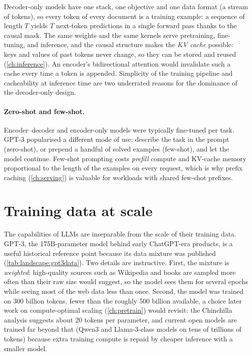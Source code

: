 \begin{systemslens}
Decoder-only models have one stack, one objective and one data format (a stream of tokens), so
every token of every document is a training example: a sequence of length $T$ yields $T$ next-token
predictions in a single forward pass thanks to the causal mask. The same weights and the same kernels
serve pretraining, fine-tuning, and inference, and the causal structure makes the \emph{KV cache}
possible: keys and values of past tokens never change, so they can be stored and reused
(\cref{ch:inference}). An encoder's bidirectional attention would invalidate such a cache every time a
token is appended. Simplicity of the training pipeline and cacheability at inference time are two
underrated reasons for the dominance of the decoder-only design.
\end{systemslens}

\paragraph{Zero-shot and few-shot.}
Encoder--decoder and encoder-only models were typically fine-tuned per task. GPT-3 popularised a different
mode of use: describe the task in the prompt (zero-shot), or prepend a handful of solved examples
(few-shot), and let the model continue. Few-shot prompting costs \emph{prefill} compute and KV-cache
memory proportional to the length of the examples on every request, which is why prefix caching
(\cref{ch:serving}) is valuable for workloads with shared few-shot prefixes.

\section{Training data at scale}\label{sec:landscape:data}

The capabilities of LLMs are inseparable from the scale of their training data. GPT-3, the 175B-parameter
model behind early ChatGPT-era products, is a useful historical reference point because its data mixture
was published (\cref{tab:landscape:gpt3data}). Two details are instructive. First, the mixture is
\emph{weighted}: high-quality sources such as Wikipedia and books are sampled more often than their raw
size would suggest, so the model sees them for several epochs while seeing most of the web data less
than once. Second, the model was trained on 300 billion tokens, fewer than the roughly 500 billion
available, a choice later work on compute-optimal scaling (\cref{ch:pretrain}) would revisit: the
Chinchilla analysis suggests about 20 tokens per parameter, and current open models are trained far
beyond that (Qwen3 and Llama-3-class models on tens of trillions of tokens) because extra training
compute is repaid by cheaper inference with a smaller model.

